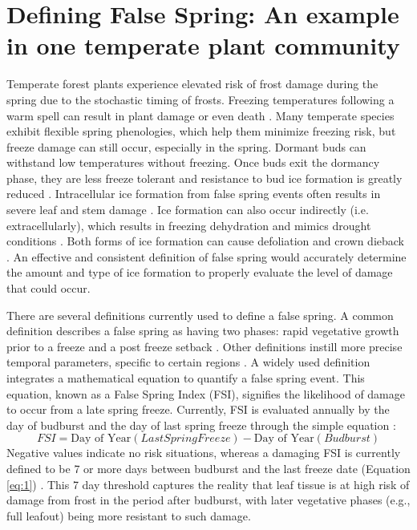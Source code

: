 \documentclass{article}\usepackage[]{graphicx}\usepackage[]{color}
\begin{document}
\section*{Defining False Spring: An example in one temperate plant community}
Temperate forest plants experience elevated risk of frost damage during the spring due to the stochastic timing of frosts. Freezing temperatures following a warm spell can result in plant damage or even death \citep{Ludlum1968, Mock2007}. Many temperate species exhibit flexible spring phenologies, which help them minimize freezing risk, but freeze damage can still occur, especially in the spring. Dormant buds can withstand low temperatures without freezing. Once buds exit the dormancy phase, they are less freeze tolerant and resistance to bud ice formation is greatly reduced \citep{Taschler2004, Lenz2013, Vitasse2014a}. Intracellular ice formation from false spring events often results in severe leaf and stem damage \citep{Burke1976, Sakai1987}. Ice formation can also occur indirectly (i.e. extracellularly), which results in freezing dehydration and mimics drought conditions \citep{Pearce2001, Beck2004, Hofmann2015}. Both forms of ice formation can cause defoliation and crown dieback \citep{Gu2008}. An effective and consistent definition of false spring would accurately determine the amount and type of ice formation to properly evaluate the level of damage that could occur.

There are several definitions currently used to define a false spring. A common definition describes a false spring as having two phases: rapid vegetative growth prior to a freeze and a post freeze setback \citep{Gu2008}. Other definitions instill more precise temporal parameters, specific to certain regions \citep[e.g., in][false spring for the Midwestern United States is defined as a warmer than average March, a freezing April, and enough growing degree days between budburst and the last freeze date]{Augspurger2013}. A widely used definition integrates a mathematical equation to quantify a false spring event. This equation, known as a False Spring Index (FSI), signifies the likelihood of damage to occur from a late spring freeze. Currently, FSI is evaluated annually by the day of budburst and the day of last spring freeze \citep[often calculated at -2.2$^{\circ}$C][]{Schwartz1993} through the simple equation \citep{Marino2011}:
\begin{equation} \label{eq:1}
FSI = \text{Day of Year} (Last Spring Freeze) - \text{Day of Year} (Budburst)
\end{equation}
Negative values indicate no risk situations, whereas a damaging FSI is currently defined to be 7 or more days between budburst and the last freeze date (Equation \ref{eq:1}) \citep{Peterson2014}. This 7 day threshold captures the reality that leaf tissue is at high risk of damage from frost in the period after budburst, with later vegetative phases (e.g., full leafout) being more resistant to such damage.
\end{document}
